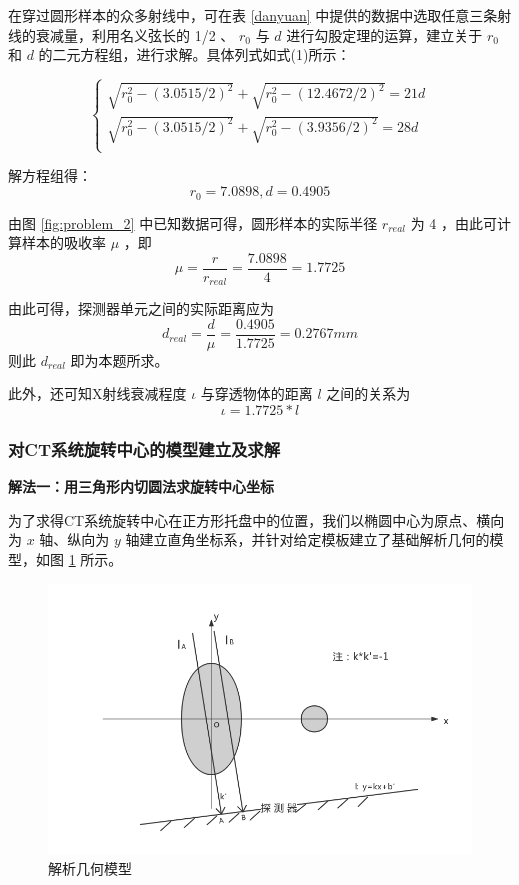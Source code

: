 \documentclass[UTF8]{ctexart}
\begin{document}
在穿过圆形样本的众多射线中，可在表 \ref{danyuan} 中提供的数据中选取任意三条射线的衰减量，利用名义弦长的 1/2 、 $r_0$ 与 $d$ 进行勾股定理的运算，建立关于 
$r_0$ 和 $d$ 的二元方程组，进行求解。具体列式如式(1)所示：

\begin{equation}
  \begin{cases}
    \sqrt{r_0^2-(3.0515/2)^2}+\sqrt{r_0^2-(12.4672/2)^2}=21d \\
    \sqrt{r_0^2-(3.0515/2)^2}+\sqrt{r_0^2-(3.9356/2)^2}=28d  \\
  \end{cases}
\end{equation}

解方程组得：
$$r_0=7.0898,d=0.4905$$

由图 \ref{fig:problem_2} 中已知数据可得，圆形样本的实际半径 $r_{real}$ 为 4 ，由此可计算样本的吸收率 $\mu$ ，即
$$ \mu = \frac{r}{r_{real}} = \frac{7.0898}{4} = 1.7725 $$

由此可得，探测器单元之间的实际距离应为
$$ d_{real} = \frac{d}{\mu} = \frac{0.4905}{1.7725} = 0.2767mm $$
则此 $d_{real}$ 即为本题所求。

此外，还可知X射线衰减程度 $\iota$ 与穿透物体的距离 $l$ 之间的关系为
$$ \iota = 1.7725*l $$

\subsubsection{对CT系统旋转中心的模型建立及求解}

\textbf{解法一：用三角形内切圆法求旋转中心坐标}

为了求得CT系统旋转中心在正方形托盘中的位置，我们以椭圆中心为原点、横向为 $x$ 轴、纵向为 $y$ 轴建立直角坐标系，并针对给定模板建立了基础解析几何的模型，如图 \ref{fig:oval} 所示。

\begin{figure}[htbp]
  \centering
  \includegraphics[width=5in]{../figure/oval.png}
  \caption{解析几何模型}
  \label{fig:oval}
\end{figure}
\end{document}
